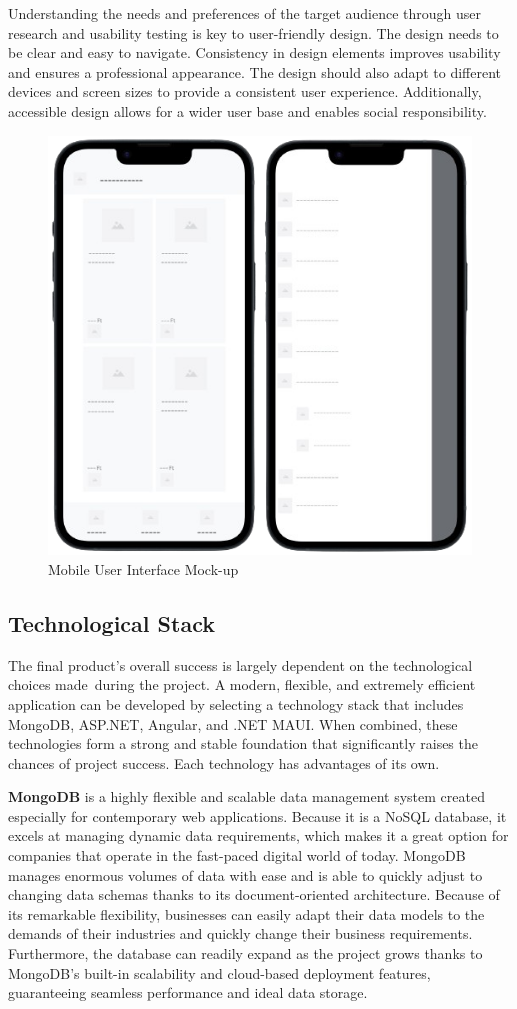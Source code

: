 Understanding the needs and preferences of the target audience through user research and usability testing is key to user-friendly design. The design needs to be clear and easy to navigate. Consistency in design elements improves usability and ensures a professional appearance. The design should also adapt to different devices and screen sizes to provide a consistent user experience. Additionally,  accessible design allows for a wider user base and enables social responsibility. \cite{userFriendly}

\begin{figure}[H]
	\centering
	\includegraphics[width=0.3\linewidth]{img/ui_mockup.png}
	\caption{Mobile User Interface Mock-up}
	\label{fig:ur5}
\end{figure}

\subsection{Technological Stack}

The final product's overall success is largely dependent on the technological choices made during the project. A modern, flexible, and extremely efficient application can be developed by selecting a technology stack that includes MongoDB, ASP.NET, Angular, and .NET MAUI. When combined, these technologies form a strong and stable foundation that significantly raises the chances of project success. Each technology has advantages of its own.

\textbf{MongoDB} is a highly flexible and scalable data management system created especially for contemporary web applications. Because it is a NoSQL database, it excels at managing dynamic data requirements, which makes it a great option for companies that operate in the fast-paced digital world of today. MongoDB manages enormous volumes of data with ease and is able to quickly adjust to changing data schemas thanks to its document-oriented architecture. Because of its remarkable flexibility, businesses can easily adapt their data models to the demands of their industries and quickly change their business requirements. Furthermore, the database can readily expand as the project grows thanks to MongoDB's built-in scalability and cloud-based deployment features, guaranteeing seamless performance and ideal data storage. \cite{mongodb}


